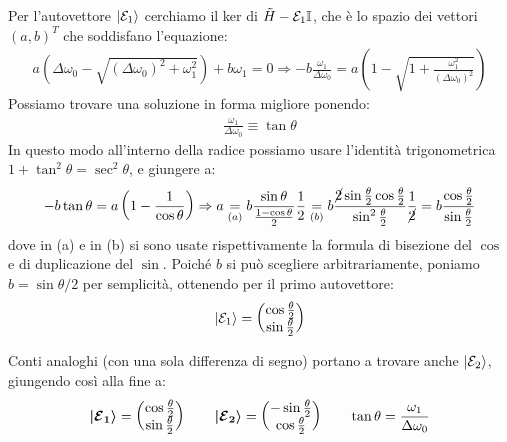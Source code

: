 \documentclass[../../InformazioneQuantistica.tex]{subfiles}
\begin{document}
\begin{enumerate}
Per l'autovettore $\Ket{\mathcal{E}_1}$ cerchiamo il ker di $\tilde{H}-\mathcal{E}_1 \mathbb{I}$, che è lo spazio dei vettori $(a, b)^T$ che soddisfano l'equazione:
\begin{align*}
a(\Delta \omega_0 - \sqrt{(\Delta \omega_0)^2 + \omega_1^2} )+b\omega_1 = 0 \Rightarrow -b \frac{\omega_1}{\Delta \omega_0} = a\left(1-\sqrt{1+\frac{\omega_1^2}{(\Delta \omega_0)^2}}\right)
\end{align*}
Possiamo trovare una soluzione in forma migliore ponendo:
\begin{align*}
\frac{\omega_1}{\Delta \omega_0} \equiv \tan\theta
\end{align*}
In questo modo all'interno della radice possiamo usare l'identità trigonometrica $1+\tan^2\theta=\sec^2\theta$, e giungere a:
\begin{align*}
-b\tan\theta = a \left(1-\frac{1}{\cos\theta}\right) \Rightarrow a \underset{(a)}{=} b\frac{\sin \theta}{\frac{1-\cos\theta}{2}}\frac{1}{2} \underset{(b)}{=} b\frac{\cancel{2}\sin\frac{\theta}{2}\cos\frac{\theta}{2}}{\sin^2 \frac{\theta}{2}}\frac{1}{\cancel{2}} = b \frac{\cos \frac{\theta}{2}}{\sin\frac{\theta}{2}} 
\end{align*}
dove in (a) e in (b) si sono usate rispettivamente la formula di bisezione del $\cos$ e di duplicazione del $\sin$. Poiché $b$ si può scegliere arbitrariamente, poniamo $b=\sin \theta/2$ per semplicità, ottenendo per il primo autovettore:
\begin{align*}
\Ket{\mathcal{E}_1} = \begin{pmatrix} \cos\frac{\theta}{2} \\ \sin\frac{\theta}{2}\end{pmatrix}
\end{align*}

Conti analoghi (con una sola differenza di segno) portano a trovare anche $\Ket{\mathcal{E}_2}$, giungendo così alla fine a:
\begin{align*}
\bm{\Ket{\mathcal{E}_1}} = \begin{pmatrix} \cos\frac{\theta}{2} \\ \sin\frac{\theta}{2}\end{pmatrix} \qquad \bm{\Ket{\mathcal{E}_2}}=\begin{pmatrix} -\sin\frac{\theta}{2}\\ \cos\frac{\theta}{2}\end{pmatrix} \qquad \tan \theta = \frac{\omega_1}{\Delta \omega_0}
\end{align*}


\end{enumerate}
\end{document}
